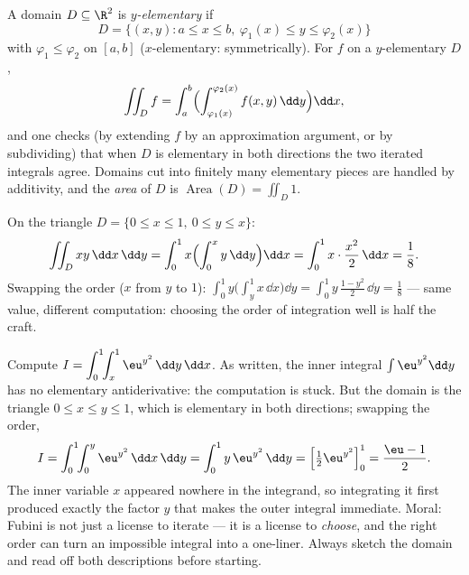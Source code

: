 \begin{definition}\label{def:b2:multint:domain}
A domain $D \subseteq \R^2$ is \emph{$y$-elementary} if
\[
D = \{(x, y) : a \leq x \leq b,\
\varphi_1(x) \leq y \leq \varphi_2(x)\}
\]
with $\varphi_1 \leq \varphi_2$  on $[a,b]$
($x$-elementary: symmetrically). For $f$ \omterm{def:b2:metric:continuity}{continuous} on a
$y$-elementary $D$,
\[
\iint_D f
= \int_a^b\Bigl(
\int_{\varphi_1(x)}^{\varphi_2(x)} f(x,y)\,\dd y\Bigr)\dd x ,
\]
and one checks (by extending $f$ by an approximation argument, or
by subdividing) that when $D$ is elementary in both directions the
two iterated integrals agree. Domains cut into finitely many
elementary pieces are handled by additivity, and the
\emph{area} of $D$ is $\operatorname
{Area}(D) = \iint_D 1$.
\end{definition}

\begin{example}\label{ex:b2:multint:triangle}
On the triangle $D = \{0 \leq x \leq 1,\ 0 \leq y \leq x\}$:
\[
\iint_D xy \,\dd x\,\dd y
= \int_0^1 x\Bigl(\int_0^x y\,\dd y\Bigr)\dd x
= \int_0^1 x\cdot\frac{x^2}{2}\,\dd x = \frac18 .
\]
Swapping the order ($x$ from $y$ to $1$): $\int_0^1
y\bigl(\int_y^1 x\,\dd x\bigr)\dd y = \int_0^1
y\,\frac{1 - y^2}{2}\,\dd y = \frac18$ --- same value, different
computation: choosing the order of integration well is half the
craft.
\end{example}

\begin{example}\label{ex:b2:multint:swaporder}
Compute $I = \displaystyle\int_0^1\!\!\int_x^1
\eu^{y^2}\,\dd y\,\dd x$. As written, the inner integral
$\int\eu^{y^2}\dd y$ has no elementary antiderivative: the
computation is stuck. But the domain is the triangle $0 \leq
x \leq y \leq 1$, which is elementary in both directions;
swapping the order,
\[
I = \int_0^1\!\!\int_0^y \eu^{y^2}\,\dd x\,\dd y
= \int_0^1 y\,\eu^{y^2}\,\dd y
= \Bigl[\tfrac12\eu^{y^2}\Bigr]_0^1 = \frac{\eu - 1}{2} .
\]
The inner variable $x$ appeared nowhere in the integrand, so
integrating it first produced exactly the factor $y$ that
makes the outer integral immediate. Moral: Fubini is not just
a license to iterate --- it is a license to \emph{choose},
and the right order can turn an impossible integral into a
one-liner. Always sketch the domain and read off both
descriptions before starting.
\end{example}

